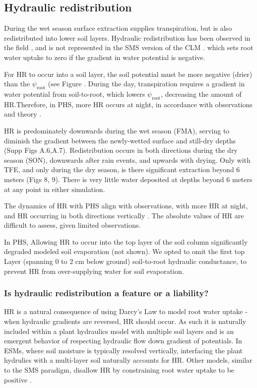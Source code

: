 \documentclass[draft,linenumbers]{agujournal}
\begin{document}
\subsection{Hydraulic redistribution}

    During the wet season surface extraction supplies transpiration, but is also redistributed into lower soil layers. Hydraulic redistribution has been observed in the field \citep{oliveira2005}, and is not represented in the SMS version of the CLM \citep{lee2005}. which sets root water uptake to zero if the gradient in water potential is negative. 
    
    For HR to occur into a soil layer, the soil potential must be more negative (drier) than the $\psi_{\text{root}}$ (see Figure . During the day, transpiration requires a gradient in water potential from soil-to-root, which lowers $\psi_{\text{root}}$, decreasing the amount of HR.Therefore, in PHS, more HR occurs at night, in accordance with observations and theory \citep{oliveira2005,lee2005}.
    
    HR is predominately downwards during the wet season (FMA), serving to diminish the gradient between the newly-wetted surface and still-dry depths (Supp Figs A.6,A.7). Redistribution occurs in both directions during the dry season (SON), downwards after rain events, and upwards with drying. Only with TFE, and only during the dry season, is there significant extraction beyond 6 meters (Figs 8, 9). There is very little water deposited at depths beyond 6 meters at any point in either simulation.

    
    The dynamics of HR with PHS align with observations, with more HR at night, and HR occurring in both directions vertically \citep{burgess1998}.
    The absolute values of HR are difficult to assess, given limited observations.
    
    In PHS, Allowing HR to occur into the top layer of the soil column significantly degraded modeled soil evaporation (not shown). We opted to omit the first top Layer (spanning 0 to 2 cm below ground) soil-to-root hydraulic conductance, to prevent HR from over-supplying water for soil evaporation.
    
\subsubsection{Is hydraulic redistribution a feature or a liability?}
   
    HR is a natural consequence of using Darcy's Law to model root water uptake - when hydraulic gradients are reversed, HR should occur. As such it is naturally included within a plant hydraulics model with multiple soil layers and is an emergent behavior of respecting hydraulic flow down gradient of potentials.  In ESMs, where soil moisture is typically resolved vertically, interfacing the plant hydrulics with a multi-layer soil naturally accounts for HR. Other models, similar to the SMS paradigm, disallow HR by constraining root water uptake to be positive \citep{xu2016}.
    
\end{document}

